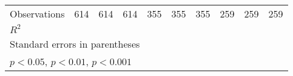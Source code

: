{\begin{tabular}{l*{9}{c}}
\hline
Observations&         614         &         614         &         614         &         355         &         355         &         355         &         259         &         259         &         259         \\
\(R^{2}\)   &                     &                     &                     &                     &                     &                     &                     &                     &                     \\
\hline\hline
\multicolumn{10}{l}{\footnotesize Standard errors in parentheses}\\
\multicolumn{10}{l}{\footnotesize \sym{*} \(p<0.05\), \sym{**} \(p<0.01\), \sym{***} \(p<0.001\)}\\
\end{tabular}
}
